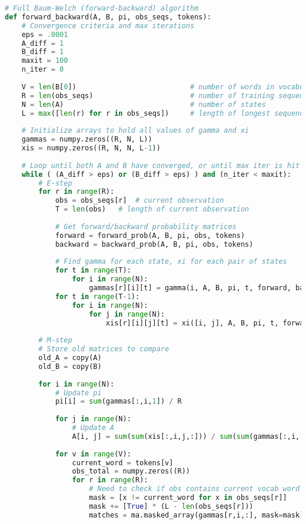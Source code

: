 \documentclass[14pt]{article}
\begin{document}
\begin{lstlisting}[language=Python]
# Full Baum-Welch (forward-backward) algorithm
def forward_backward(A, B, pi, obs_seqs, tokens):
    # Convergence criteria and max iterations
    eps = .0001
    A_diff = 1
    B_diff = 1
    maxit = 100
    n_iter = 0
    
    V = len(B[0])                           # number of words in vocabulary
    R = len(obs_seqs)                       # number of training sequences
    N = len(A)                              # number of states
    L = max([len(r) for r in obs_seqs])     # length of longest sequence
    
    # Initialize arrays to hold all values of gamma and xi
    gammas = numpy.zeros((R, N, L))
    xis = numpy.zeros((R, N, N, L-1))
    
    # Loop until both A and B have converged, or until max iter is hit
    while ( (A_diff > eps) or (B_diff > eps) ) and (n_iter < maxit):
        # E-step
        for r in range(R):
            obs = obs_seqs[r]  # current observation
            T = len(obs)   # length of current observation
            
            # Get forward/backward probability matrices
            forward = forward_prob(A, B, pi, obs, tokens)
            backward = backward_prob(A, B, pi, obs, tokens)
            
            # Find gamma for each state, xi for each pair of states
            for t in range(T):
                for i in range(N):
                    gammas[r][i][t] = gamma(i, A, B, pi, t, forward, backward)
            for t in range(T-1):
                for i in range(N):
                    for j in range(N):
                        xis[r][i][j][t] = xi([i, j], A, B, pi, t, forward, backward, obs, tokens)
        
        # M-step
        # Store old matrices to compare
        old_A = copy(A)
        old_B = copy(B)
        
        for i in range(N):
            # Update pi
            pi[i] = sum(gammas[:,i,1]) / R
            
            for j in range(N):
                # Update A
                A[i, j] = sum(sum(xis[:,i,j,:])) / sum(sum(gammas[:,i,:-1]))
                
            for v in range(V): 
                current_word = tokens[v]
                obs_total = numpy.zeros((R))
                for r in range(R):
                    # Need to check if obs contains current vocab word
                    mask = [x != current_word for x in obs_seqs[r]]
                    mask += [True] * (L - len(obs_seqs[r]))
                    matches = ma.masked_array(gammas[r,i,:], mask=mask)


\end{lstlisting}
\end{document}

